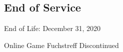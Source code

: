 

\subsection{End of Service}
\begin{frame}{\insertsubsection}
	\begin{fancycolumns}
		\begin{exampletight}{{End of Life: December 31, 2020}}
			\centering{}
		\end{exampletight}
		\nextcolumn
		\begin{exampletight}{Online Game Fuchstreff Discontinued}
		\end{exampletight}
	\end{fancycolumns}
\end{frame}



